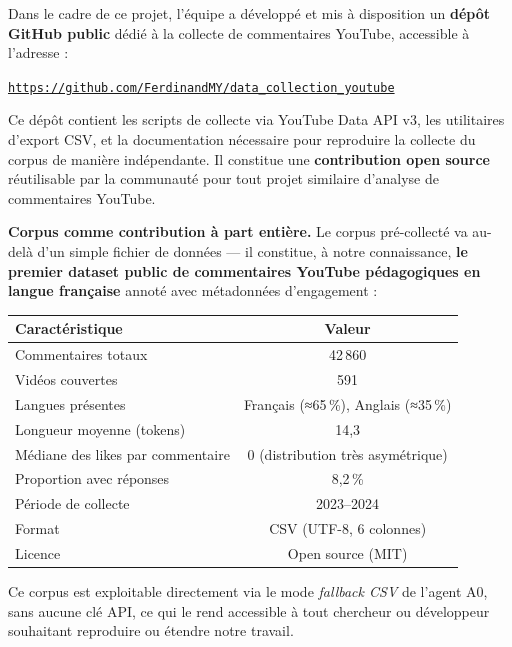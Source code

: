 \documentclass[12pt, a4paper]{article}
\begin{document}
Dans le cadre de ce projet, l'équipe a développé et mis à disposition un
\textbf{dépôt GitHub public} dédié à la collecte de commentaires YouTube,
accessible à l'adresse :

\begin{center}
  \href{https://github.com/FerdinandMY/data_collection_youtube}{%
    \texttt{https://github.com/FerdinandMY/data\_collection\_youtube}}
\end{center}

Ce dépôt contient les scripts de collecte via YouTube Data API v3, les utilitaires
d'export CSV, et la documentation nécessaire pour reproduire la collecte du corpus
de manière indépendante. Il constitue une \textbf{contribution open source} réutilisable
par la communauté pour tout projet similaire d'analyse de commentaires YouTube.

\textbf{Corpus comme contribution à part entière.}
Le corpus pré-collecté va au-delà d'un simple fichier de données — il constitue,
à notre connaissance, \textbf{le premier dataset public de commentaires YouTube
pédagogiques en langue française} annoté avec métadonnées d'engagement :

\begin{center}
\begin{tabular}{lc}
\toprule
\textbf{Caractéristique} & \textbf{Valeur} \\
\midrule
Commentaires totaux              & 42\,860 \\
Vidéos couvertes                 & 591 \\
Langues présentes                & Français (≈65\,\%), Anglais (≈35\,\%) \\
Longueur moyenne (tokens)        & 14{,}3 \\
Médiane des likes par commentaire & 0 (distribution très asymétrique) \\
Proportion avec réponses         & 8{,}2\,\% \\
Période de collecte              & 2023--2024 \\
Format                           & CSV (UTF-8, 6 colonnes) \\
Licence                          & Open source (MIT) \\
\bottomrule
\end{tabular}
\end{center}

Ce corpus est exploitable directement via le mode \textit{fallback CSV} de l'agent A0,
sans aucune clé API, ce qui le rend accessible à tout chercheur ou développeur
souhaitant reproduire ou étendre notre travail.
\end{document}
